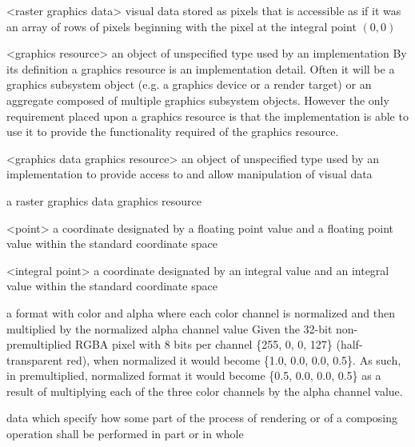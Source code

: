 <raster graphics data> visual data stored as pixels that is accessible as if it was an array of rows of pixels beginning with the pixel at the integral point $(0,0)$

<graphics resource> an object of unspecified type used by an implementation
\enternote
By its definition a graphics resource is an implementation detail. Often it will be a graphics subsystem object (e.g. a graphics device or a render target) or an aggregate composed of multiple graphics subsystem objects. However the only requirement placed upon a graphics resource is that the implementation is able to use it to provide the functionality required of the graphics resource.
\exitnote

<graphics data graphics resource> an object of unspecified type used by an implementation to provide access to and allow manipulation of visual data

\indexdefn{\pixmap}
a raster graphics data graphics resource

<point> a coordinate designated by a floating point \xaxis{} value and a floating point \yaxis{} value within the standard coordinate space

<integral point> a coordinate designated by an integral \xaxis{} value and an integral \yaxis{} value within the standard coordinate space

a format with color and alpha where each color channel is normalized and then 
multiplied by the normalized alpha channel value
\enterexample
Given the 32-bit non-premultiplied RGBA pixel with 8 bits per channel \{255, 0, 
0, 127\} (half-transparent red), when normalized it would become \{1.0, 0.0, 
0.0, 0.5\}. As such, in premultiplied, normalized format it would become \{0.5, 
0.0, 0.0, 0.5\} as a result of multiplying each of the three color channels by 
the alpha channel value.
\exitexample

data which specify how some part of the process of rendering or of a composing operation shall be performed in part or in whole

